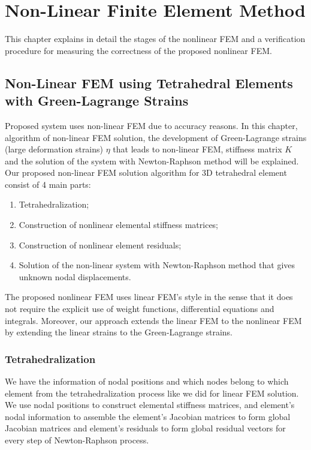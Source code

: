 \chapter{Non-Linear Finite Element Method}
\label{chapter5}

This chapter explains in detail the stages of the nonlinear FEM and a verification procedure for measuring the
correctness of the proposed nonlinear FEM.

\section{Non-Linear FEM using Tetrahedral Elements with Green-Lagrange Strains}
\label{sec4NonLinFEM}

Proposed system uses non-linear FEM due to accuracy reasons. In this chapter, algorithm of non-linear FEM solution, the development of Green-Lagrange strains (large deformation strains) $\eta$ that leads to non-linear FEM, stiffness matrix $K$ and the solution of the system with Newton-Raphson method will be explained. Our proposed non-linear FEM solution algorithm for 3D tetrahedral element consist of 4 main parts:

\begin{enumerate}
\item Tetrahedralization;
\item Construction of nonlinear elemental stiffness matrices;
\item Construction of nonlinear element residuals;
\item Solution of the non-linear system with Newton-Raphson method that gives unknown nodal displacements.
\end{enumerate}

The proposed nonlinear FEM uses linear FEM's style in the sense that it does not require the explicit use of weight functions, differential equations and integrals. Moreover, our approach extends the linear FEM to the nonlinear FEM by extending the linear
strains to the Green-Lagrange strains.

\subsection{Tetrahedralization}
We have the information of nodal positions and which nodes belong to which element from the tetrahedralization process like we did for linear FEM solution. We use nodal positions to construct elemental stiffness matrices, and element's nodal information to assemble the element's Jacobian matrices to form global Jacobian matrices and element's residuals to form global residual vectors for every step of Newton-Raphson process.


